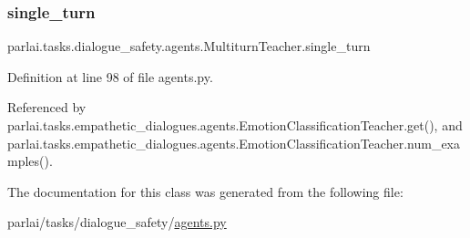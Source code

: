 \subsubsection{\texorpdfstring{single\+\_\+turn}{single\_turn}}
{\footnotesize\ttfamily parlai.\+tasks.\+dialogue\+\_\+safety.\+agents.\+Multiturn\+Teacher.\+single\+\_\+turn}



Definition at line 98 of file agents.\+py.



Referenced by parlai.\+tasks.\+empathetic\+\_\+dialogues.\+agents.\+Emotion\+Classification\+Teacher.\+get(), and parlai.\+tasks.\+empathetic\+\_\+dialogues.\+agents.\+Emotion\+Classification\+Teacher.\+num\+\_\+examples().



The documentation for this class was generated from the following file\+:\begin{DoxyCompactItemize}
\item 
parlai/tasks/dialogue\+\_\+safety/\hyperlink{parlai_2tasks_2dialogue__safety_2agents_8py}{agents.\+py}\end{DoxyCompactItemize}

